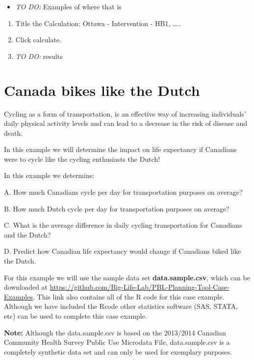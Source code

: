 \documentclass[]{book}
\providecommand{\tightlist}{%
  \setlength{\itemsep}{0pt}\setlength{\parskip}{0pt}}
\begin{document}
\begin{itemize}
\tightlist
\item
  \emph{TO DO: } Examples of where that is
\end{itemize}

\begin{enumerate}
\def\labelenumi{\arabic{enumi}.}
\setcounter{enumi}{5}
\item
  Title the Calculation: Ottawa - Intervention - HB1, \ldots{}..
\item
  Click calculate.
\item
  \emph{TO DO:} results
\end{enumerate}

\section{Canada bikes like the Dutch}\label{canada-bikes-like-the-dutch}

Cycling as a form of transportation, is an effective way of increasing
individuals' daily physical activity levels and can lead to a decrease
in the risk of disease and death.

In this example we will determine the impact on life expectancy if
Canadians were to cycle like the cycling enthusiasts the Dutch!

In this example we determine:

A. How much Canadians cycle per day for transportation purposes on
average?

B. How much Dutch cycle per day for transportation purposes on average?

C. What is the average difference in daily cycling transportation for
Canadians and the Dutch?

D. Predict how Canadian life expectancy would change if Canadians biked
like the Dutch.

For this example we will use the sample data set
\textbf{data.sample.csv}, which can be downloaded at
\url{https://github.com/Big-Life-Lab/PBL-Planning-Tool-Case-Examples}.
This link also contains all of the R code for this case example.
Although we have included the Rcode other statistics software (SAS,
STATA, etc) can be used to complete this case example.

\textbf{Note:} Although the data.sample.csv is based on the 2013/2014
Canadian Community Health Survey Public Use Microdata File,
data.sample.csv is a completely synthetic data set and can only be used
for exemplary purposes.
\end{document}
